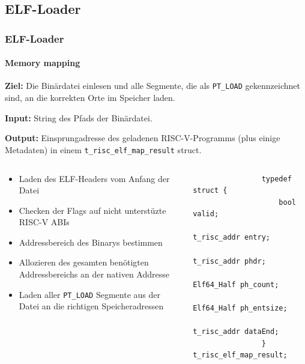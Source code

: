 \documentclass[german]{tum-presentation}
\begin{document}
\subsection{ELF-Loader} %
\begin{frame}[fragile]
	\frametitle{ELF-Loader}
	\framesubtitle{Memory mapping}
	\textbf{Ziel:} Die Binärdatei einlesen und alle Segmente, die als \verb!PT_LOAD! gekennzeichnet sind, an die korrekten Orte im Speicher laden.

	\vspace{0.25cm}
	\textbf{Input:} String des Pfads der Binärdatei.

	\textbf{Output:} Einsprungadresse des geladenen RISC-V-Programms (plus einige Metadaten) in einem \verb!t_risc_elf_map_result! struct.

	\vspace{0.25cm}

	\begin{columns}[onlytextwidth]

		\begin{column}{0.59\textwidth}
			\begin{itemize}
				\item Laden des ELF-Headers vom Anfang der Datei
				\item Checken der Flags auf nicht unterstüzte RISC-V ABIs
				\item Addressbereich des Binarys bestimmen
				\item Allozieren des gesamten benötigten Addressbereichs an der nativen Addresse
				\item Laden aller \verb!PT_LOAD! Segmente aus der Datei an die richtigen Speicheradressen
			\end{itemize}
		\end{column}
		\begin{column}{0.39\textwidth}
			\begin{lstlisting}
				typedef struct {
   					bool valid;
    					t_risc_addr entry;
    					t_risc_addr phdr;
    					Elf64_Half ph_count;
    					Elf64_Half ph_entsize;
    					t_risc_addr dataEnd;
				} t_risc_elf_map_result;
			\end{lstlisting}
		\end{column}
	\end{columns}
\end{frame}
\end{document}
